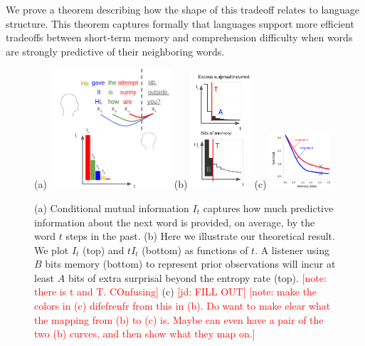 \documentclass[12pt]{article}
\newcounter{theorem}
\newcommand{\jd}[1]{\textcolor{Red}{[jd: #1]}}
\newcommand{\note}[1]{\textcolor{Red}{[note: #1]}}
\begin{document}


We prove a theorem describing how the shape of this tradeoff relates to language structure. %
This theorem captures formally that languages support more efficient tradeoffs between short-term memory and comprehension difficulty when words are strongly predictive of their neighboring words.


\begin{figure}
	(a)
\includegraphics[width=0.4\textwidth]{figures-gdrive/mi-distance.png}
	(b)
\includegraphics[width=0.2\textwidth]{figures-gdrive/theorem.png}
	(c)
\includegraphics[width=0.2\textwidth]{figures-gdrive/tradeoff.png}
	\caption{
		(a) Conditional mutual information $I_t$ captures how much predictive information about the next word is provided, on average, by the word $t$ steps in the past.
		(b) Here we illustrate our theoretical result. We plot $I_t$ (top) and $tI_t$ (bottom) as functions of $t$. A listener using $B$ bits memory (bottom) to represent prior observations will incur at least $A$ bits of extra surprisal beyond the entropy rate (top). \note{there is t and T. COnfusing}
		(c) \jd{FILL OUT} \note{make the colors in (c) difefrenfr from this in (b). Do want to make clear what the mapping from (b) to (c) is. Maybe can even have a pair of the two (b) curves, and then show what they map on.}
}\label{fig:theorem}
\end{figure}
\end{document}
